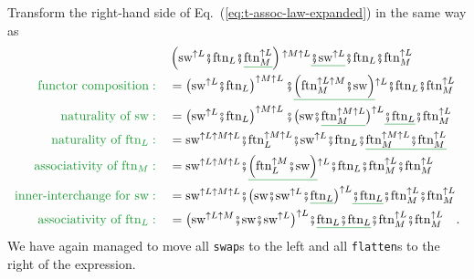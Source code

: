 Transform the right-hand side of Eq.~(\ref{eq:t-assoc-law-expanded})
in the same way as
\begin{align*}
 & \left(\text{sw}^{\uparrow L}\bef\text{ftn}_{L}\bef\gunderline{\text{ftn}_{M}^{\uparrow L}}\right)^{\uparrow M\uparrow L}\gunderline{\bef\text{sw}^{\uparrow L}}\bef\text{ftn}_{L}\bef\text{ftn}_{M}^{\uparrow L}\\
{\color{greenunder}\text{functor composition}:}\quad & =\left(\text{sw}^{\uparrow L}\bef\text{ftn}_{L}\right)^{\uparrow M\uparrow L}\bef\gunderline{\left(\text{ftn}_{M}^{\uparrow L\uparrow M}\bef\text{sw}\right)}^{\uparrow L}\bef\text{ftn}_{L}\bef\text{ftn}_{M}^{\uparrow L}\\
{\color{greenunder}\text{naturality of }\text{sw}:}\quad & =\left(\text{sw}^{\uparrow L}\bef\text{ftn}_{L}\right)^{\uparrow M\uparrow L}\bef\big(\text{sw}\bef\gunderline{\text{ftn}_{M}^{\uparrow M\uparrow L}}\big)^{\uparrow L}\gunderline{\bef\text{ftn}_{L}}\bef\text{ftn}_{M}^{\uparrow L}\\
{\color{greenunder}\text{naturality of }\text{ftn}_{L}:}\quad & =\text{sw}^{\uparrow L\uparrow M\uparrow L}\bef\text{ftn}_{L}^{\uparrow M\uparrow L}\bef\text{sw}^{\uparrow L}\bef\text{ftn}_{L}\bef\gunderline{\text{ftn}_{M}^{\uparrow M\uparrow L}\bef\text{ftn}_{M}^{\uparrow L}}\\
{\color{greenunder}\text{associativity of }\text{ftn}_{M}:}\quad & =\text{sw}^{\uparrow L\uparrow M\uparrow L}\bef\gunderline{\left(\text{ftn}_{L}^{\uparrow M}\bef\text{sw}\right)}^{\uparrow L}\bef\text{ftn}_{L}\bef\text{ftn}_{M}^{\uparrow L}\bef\text{ftn}_{M}^{\uparrow L}\\
{\color{greenunder}\text{inner-interchange for }\text{sw}:}\quad & =\text{sw}^{\uparrow L\uparrow M\uparrow L}\bef\big(\text{sw}\bef\text{sw}^{\uparrow L}\bef\gunderline{\text{ftn}_{L}}\big)^{\uparrow L}\gunderline{\bef\text{ftn}_{L}}\bef\text{ftn}_{M}^{\uparrow L}\bef\text{ftn}_{M}^{\uparrow L}\\
{\color{greenunder}\text{associativity of }\text{ftn}_{L}:}\quad & =\big(\text{sw}^{\uparrow L\uparrow M}\bef\text{sw}\bef\text{sw}^{\uparrow L}\big)^{\uparrow L}\bef\gunderline{\text{ftn}_{L}\bef\text{ftn}_{L}}\bef\text{ftn}_{M}^{\uparrow L}\bef\text{ftn}_{M}^{\uparrow L}\quad.
\end{align*}
We have again managed to move all \lstinline!swap!s
to the left and all \lstinline!flatten!s
to the right of the expression. 

